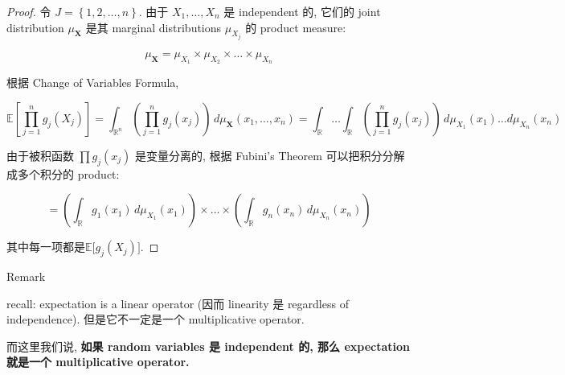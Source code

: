 \begin{proof}

令 \(\mathit{J} = \left\{ {1,2,\ldots,\mathit{n}} \right\}\). 由于 \(\mathit{X}_{1},\ldots,\mathit{X}_{\mathit{n}}\) 是 independent 的, 它们的 joint distribution \(\mathit{\mu}_{\mathbf{X}}\) 是其 marginal distributions \(\mathit{\mu}_{\mathit{X}_{\mathit{j}}}\) 的 product measure:

\[\mathit{\mu}_{\mathbf{X}} = \mathit{\mu}_{\mathit{X}_{1}} \times \mathit{\mu}_{\mathit{X}_{2}} \times \ldots \times \mathit{\mu}_{\mathit{X}_{\mathit{n}}}\]

根据 Change of Variables Formula,

\[\mathbb{E}\left\lbrack {\prod\limits_{\mathit{j} = 1}^{\mathit{n}}\mathit{g}_{\mathit{j}}(\mathit{X}_{\mathit{j}})} \right\rbrack = \int_{\mathbb{R}^{\mathit{n}}}\left( {\prod\limits_{\mathit{j} = 1}^{\mathit{n}}\mathit{g}_{\mathit{j}}(\mathit{x}_{\mathit{j}})} \right)\,\mathit{d}\mathit{\mu}_{\mathbf{X}}(\mathit{x}_{1},\ldots,\mathit{x}_{\mathit{n}}) = \int_{\mathbb{R}}\ldots\int_{\mathbb{R}}\left( {\prod\limits_{\mathit{j} = 1}^{\mathit{n}}\mathit{g}_{\mathit{j}}(\mathit{x}_{\mathit{j}})} \right)\,\mathit{d}\mathit{\mu}_{\mathit{X}_{1}}(\mathit{x}_{1})\ldots\mathit{d}\mathit{\mu}_{\mathit{X}_{\mathit{n}}}(\mathit{x}_{\mathit{n}})\]

由于被积函数 \(\prod\mathit{g}_{\mathit{j}}(\mathit{x}_{\mathit{j}})\) 是变量分离的, 根据 Fubini's Theorem 可以把积分分解成多个积分的 product:

\[= \left( {\int_{\mathbb{R}}\mathit{g}_{1}(\mathit{x}_{1})\,\mathit{d}\mathit{\mu}_{\mathit{X}_{1}}(\mathit{x}_{1})} \right) \times \ldots \times \left( {\int_{\mathbb{R}}\mathit{g}_{\mathit{n}}(\mathit{x}_{\mathit{n}})\,\mathit{d}\mathit{\mu}_{\mathit{X}_{\mathit{n}}}(\mathit{x}_{\mathit{n}})} \right)\]

其中每一项都是\(\mathbb{E}\lbrack\mathit{g}_{\mathit{j}}(\mathit{X}_{\mathit{j}})\rbrack\).

\end{proof}

\begin{qlremark}{Remark}

recall: expectation is a linear operator (因而 linearity 是 regardless of independence). 但是它不一定是一个 multiplicative operator.

而这里我们说, \textbf{如果 random variables 是 independent 的, 那么 expectation 就是一个 multiplicative operator.}

\end{qlremark}

